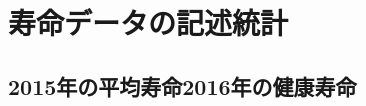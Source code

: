 %
%
%
%
%
%
%
%






%
%
%
%
%
%
%
%
%
%
%
%
%
%
%




\chapter{寿命データの記述統計}

\section{2015年の平均寿命2016年の健康寿命}


